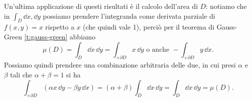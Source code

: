 Un'ultima applicazione di questi risultati è il calcolo dell'area di $D$: notiamo che in $\int_D\dd x,\dd y$ possiamo prendere l'integranda come derivata parziale di $f(x,y)=x$ rispetto a $x$ (che quindi vale 1), perciò per il teorema di Gauss-Green \ref{t:gauss-green} abbiamo
\begin{equation}
	\mu(D)=\int_D\dd x\,\dd y=\int_{+\partial D}x\,\dd y\text{ o anche }-\int_{+\partial D}y\,\dd x.
\end{equation}
Possiamo quindi prendere una combinazione arbitraria delle due, in cui presi $\alpha$ e $\beta$ tali che $\alpha+\beta=1$ si ha
\begin{equation}
	\int_{+\partial D}(\alpha x\,\dd y-\beta y\,\dd x)=(\alpha+\beta)\int_D\dd x\,\dd y=\int_D\dd x\,\dd y=\mu(D).
\end{equation}

